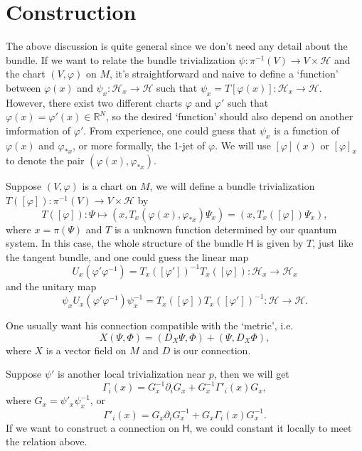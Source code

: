 \documentclass[12pt]{article}
\theoremstyle{definition}
\theoremstyle{plain}
\begin{document}
\section{Construction}

The above discussion is quite general since we don't need any detail about the bundle. If we want to relate the bundle trivialization $\psi:\pi^{-1}(V)\to V\times \mathcal H$ and the chart $(V,\varphi)$ on $M$, it's straightforward and naive to define a `function' between $\varphi(x)$ and $\psi_x:\mathcal H_x\to \mathcal H$ such that $\psi_x=T[\varphi(x)]:\mathcal H_x\to \mathcal H$. However, there exist two different charts $\varphi$ and $\varphi'$ such that $\varphi(x)=\varphi'(x)\in \mathbb R^N$, so the desired `function' should also depend on another imformation of $\varphi'$. 
From experience, one could guess that $\psi_x$ is a function of $\varphi(x)$ and $\varphi_{*x}$, or more formally, the 1-jet of $\varphi$. We will use $[\varphi](x)$ or $[\varphi]_x$ to denote the pair $(\varphi(x),\varphi_{*x})$.

Suppose $(V,\varphi)$ is a chart on $M$, we will define a bundle trivialization $T([\varphi]):\pi^{-1}(V)\to V\times \mathcal H$ by 
\[
	T([\varphi]):\Psi\mapsto (x,T_x(\varphi(x),\varphi_{*x})\Psi_x)=(x,T_x([\varphi])\Psi_x),
\]
where $x=\pi(\Psi)$ and $T$ is a unknown function determined by our quantum system. In this case, the whole structure of the bundle $\mathsf H$ is given by $T$, just like the tangent bundle, and one could guess the linear map
\begin{equation}
	U_x(\varphi'\varphi^{-1})=T_{x}([\varphi'])^{-1}T_{x}([\varphi]):\mathcal H_x\to \mathcal H_x
\end{equation}
and the unitary map
\[
	\psi_x U_x(\varphi'\varphi^{-1})\psi_x^{-1}=T_{x}([\varphi])T_{x}([\varphi'])^{-1}:\mathcal H\to \mathcal H.
\]


One usually want his connection compatible with the `metric', i.e.
\[
	X(\Psi,\Phi)=(D_X\Psi,\Phi)+(\Psi,D_X\Phi),
\]
where $X$ is a vector field on $M$ and $D$ is our connection.

Suppose $\psi'$ is another local trivialization near $p$, then we will get
\[
	\Gamma_i(x)=G_x^{-1}\partial_i G_x+G^{-1}_x\Gamma'_i(x)G_x,
\]
where $G_x=\psi'_x\psi^{-1}_x$, or 
\[
	\Gamma'_i(x)=G_x\partial_i G_x^{-1}+G_x\Gamma_i(x)G_x^{-1}.
\]
If we want to construct a connection on $\mathsf H$, we could constant it locally to meet the relation above.
\end{document}
